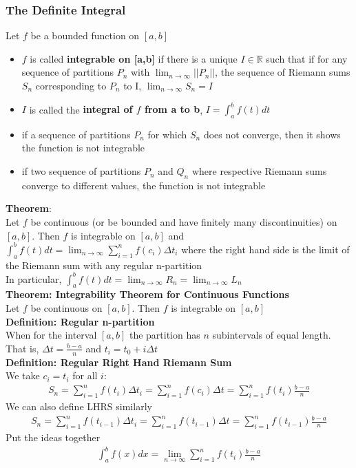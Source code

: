 \documentclass[12pt, letterpaper]{article}
\begin{document}
\subsubsection{The Definite Integral}
Let $f$ be a bounded function on $[a,b]$
\begin{itemize}
    \item $f$ is called \textbf{integrable on [a,b]} if there is a unique $I\in\mathbb{R}$ such that if for any sequence of partitions $P_n$ with $\displaystyle\lim_{n\to\infty} ||P_n||$, the sequence of Riemann sums $S_n$ corresponding to $P_n$ to I, $\displaystyle\lim_{n\to\infty} S_n = I$
    \item $I$ is called the \textbf{integral of $f$ from a to b}, $I = \int_{a}^{b} f(t) dt$
    \item if a sequence of partitions $P_n$ for which $S_n$ does not converge, then it shows the function is not integrable 
    \item if two sequence of partitions $P_n$ and $Q_n$ where respective Riemann sums converge to different values, the function is not integrable
\end{itemize}
\textbf{Theorem}: \\
Let $f$ be continuous (or be bounded and have finitely many discontinuities) on $[a,b]$. Then 
$f$ is integrable on $[a,b]$ and $\int_{a}^{b} f(t)dt = \displaystyle\lim_{n\to\infty} \displaystyle\sum_{i=1}^{n} f(c_i)\Delta t_i$
where the right hand side is the limit of the Riemann sum with any regular n-partition \\
In particular, $\int_{a}^{b} f(t)dt = \displaystyle\lim_{n\to\infty}R_n = \displaystyle\lim_{n\to\infty}L_n$ \\
\textbf{Theorem: Integrability Theorem for Continuous Functions} \\
Let $f$ be continuous on $[a,b]$. Then $f$ is integrable on $[a,b]$ \\
\textbf{Definition: Regular n-partition} \\
When for the interval $[a,b]$ the partition has $n$ subintervals of equal length. That is, $\Delta t = \frac{b-a}{n}$ and $t_i = t_0 + i\Delta t$ \\
\textbf{Definition: Regular Right Hand Riemann Sum} \\
We take $c_i = t_i$ for all $i$: 
\begin{align*}
    S_n = \displaystyle\sum_{i=1}^{n} f(t_i)\Delta t_i = \sum_{i=1}^{n} f(c_i)\Delta t = \sum_{i=1}^{n} f(t_i)\frac{b-a}{n}
\end{align*}
We can also define LHRS similarly
\begin{align*}
    S_n = \displaystyle\sum_{i=1}^{n} f(t_{i-1})\Delta t_i = \sum_{i=1}^{n} f(t_{i-1})\Delta t = \sum_{i=1}^{n} f(t_{i-1})\frac{b-a}{n}
\end{align*}
Put the ideas together
\begin{align*}
    \int_{a}^{b}f(x)dx = \displaystyle\lim_{n\to\infty}\sum_{i=1}^{n}f(t_i)\frac{b-a}{n}
\end{align*}
\end{document}

